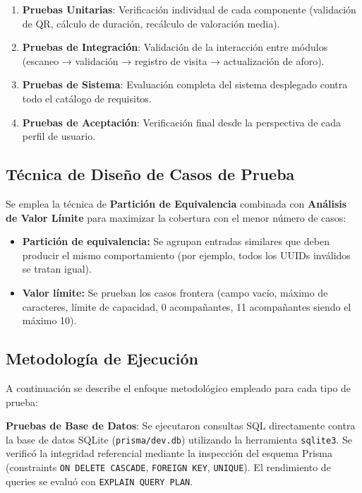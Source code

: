 \begin{enumerate}
    \item \textbf{Pruebas Unitarias}: Verificación individual de cada componente (validación de QR, cálculo de duración, recálculo de valoración media).
    \item \textbf{Pruebas de Integración}: Validación de la interacción entre módulos (escaneo → validación → registro de visita → actualización de aforo).
    \item \textbf{Pruebas de Sistema}: Evaluación completa del sistema desplegado contra todo el catálogo de requisitos.
    \item \textbf{Pruebas de Aceptación}: Verificación final desde la perspectiva de cada perfil de usuario.
\end{enumerate}

\subsection{Técnica de Diseño de Casos de Prueba}

Se emplea la técnica de \textbf{Partición de Equivalencia} combinada con \textbf{Análisis de Valor Límite} para maximizar la cobertura con el menor número de casos:

\begin{itemize}
    \item \textbf{Partición de equivalencia:} Se agrupan entradas similares que deben producir el mismo comportamiento (por ejemplo, todos los UUIDs inválidos se tratan igual).
    \item \textbf{Valor límite:} Se prueban los casos frontera (campo vacío, máximo de caracteres, límite de capacidad, 0 acompañantes, 11 acompañantes siendo el máximo 10).
\end{itemize}

\subsection{Metodología de Ejecución}

A continuación se describe el enfoque metodológico empleado para cada tipo de prueba:

\textbf{Pruebas de Base de Datos}: Se ejecutaron consultas SQL directamente contra la base de datos SQLite (\texttt{prisma/dev.db}) utilizando la herramienta \texttt{sqlite3}. Se verificó la integridad referencial mediante la inspección del esquema Prisma (constraints \texttt{ON DELETE CASCADE}, \texttt{FOREIGN KEY}, \texttt{UNIQUE}). El rendimiento de queries se evaluó con \texttt{EXPLAIN QUERY PLAN}.

